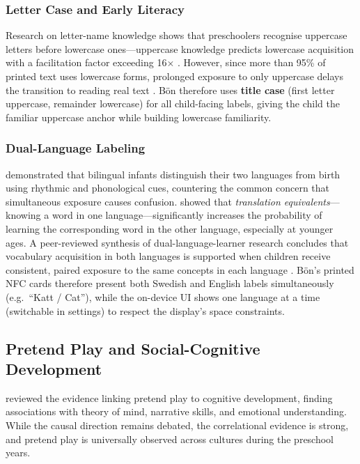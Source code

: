 \documentclass[12pt, a4paper]{article}
\newcommand{\Bodn}{B\"o\dh{}n}
\begin{document}
\subsubsection*{Letter Case and Early Literacy}

Research on letter-name knowledge shows that preschoolers recognise uppercase
letters before lowercase ones---uppercase knowledge predicts lowercase
acquisition with a facilitation factor exceeding 16$\times$
\citep{piasta2014letter}. However, since more than 95\% of printed text uses
lowercase forms, prolonged exposure to only uppercase delays the transition to
reading real text \citep{treiman2006case}. \Bodn{} therefore uses \textbf{title
case} (first letter uppercase, remainder lowercase) for all child-facing
labels, giving the child the familiar uppercase anchor while building lowercase
familiarity.

\subsubsection*{Dual-Language Labeling}

\citet{byersheinlein2013bilingualism} demonstrated that bilingual infants
distinguish their two languages from birth using rhythmic and phonological cues,
countering the common concern that simultaneous exposure causes confusion.
\citet{tan2024translation} showed that \emph{translation equivalents}---knowing
a word in one language---significantly increases the probability of learning the
corresponding word in the other language, especially at younger ages. A peer-reviewed synthesis of
dual-language-learner research concludes that vocabulary acquisition in both
languages is supported when children receive consistent, paired exposure to
the same concepts in each language \citep{barac2014cognitive}. \Bodn{}'s printed NFC cards therefore present both
Swedish and English labels simultaneously (e.g.\ ``Katt / Cat''), while the
on-device UI shows one language at a time (switchable in settings) to respect
the display's space constraints.

\subsection{Pretend Play and Social-Cognitive Development}
\label{sec:pretend_play}

\citet{lillard2013impact} reviewed the evidence linking pretend play to
cognitive development, finding associations with theory of mind, narrative
skills, and emotional understanding. While the causal direction remains debated,
the correlational evidence is strong, and pretend play is universally observed
across cultures during the preschool years.
\end{document}
